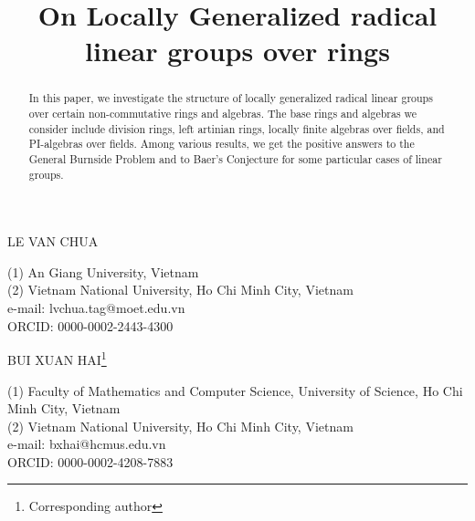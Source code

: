 \documentclass{amsart}
\theoremstyle{definition}
\begin{document}
	
	
	\title[On Locally Generalized radical linear groups over rings ]{On Locally Generalized radical linear groups over rings} 
	
	
	\maketitle
	\begin{center}{LE VAN CHUA}\end{center}
	\begin{center}	
		\tiny{(1) An Giang University, Vietnam\\(2) Vietnam National University, Ho Chi Minh City, Vietnam\\
			e-mail: lvchua.tag@moet.edu.vn\\
			ORCID: 0000-0002-2443-4300}
	\end{center}
	
	\begin{center} {BUI XUAN HAI\footnote{Corresponding author}}
	\end{center}
	\begin{center}	
		\tiny{(1) Faculty of Mathematics and Computer Science, University of Science, Ho Chi Minh City, Vietnam\\(2) Vietnam National University, Ho Chi Minh City, Vietnam\\
			e-mail:  bxhai@hcmus.edu.vn\\
			ORCID: 0000-0002-4208-7883} 
	\end{center} 
		
\begin{abstract} In this paper, we investigate the structure of locally generalized radical linear groups over certain non-commutative rings and algebras. The base rings and algebras we consider include division rings, left artinian rings, locally finite algebras over fields, and PI-algebras over fields. Among various results, we get the positive answers to the General Burnside Problem and to Baer's Conjecture for some particular cases of linear groups. 
\end{abstract}
	
\end{document}
